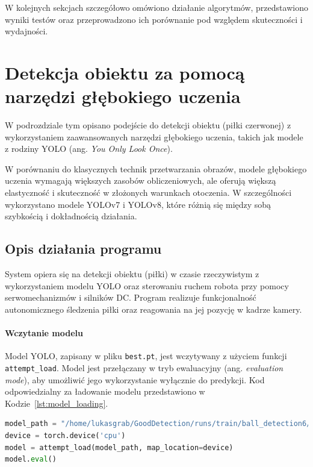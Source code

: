 \documentclass[a4paper,twoside,12pt]{book}
\begin{document}
W kolejnych sekcjach szczegółowo omówiono działanie algorytmów, przedstawiono wyniki testów oraz przeprowadzono ich porównanie pod względem skuteczności i wydajności. 


\section{Detekcja obiektu za pomocą narzędzi głębokiego uczenia}

W podrozdziale tym opisano podejście do detekcji obiektu (piłki czerwonej) z wykorzystaniem zaawansowanych narzędzi głębokiego uczenia, takich jak modele z rodziny YOLO (ang. \textit{You Only Look Once}).

W porównaniu do klasycznych technik przetwarzania obrazów, modele głębokiego uczenia wymagają większych zasobów obliczeniowych, ale oferują większą elastyczność i skuteczność w złożonych warunkach otoczenia. W szczególności wykorzystano modele YOLOv7 i YOLOv8, które różnią się między sobą szybkością i dokładnością działania.

\newpage
\subsection{Opis działania programu}

System opiera się na detekcji obiektu (piłki) w czasie rzeczywistym z wykorzystaniem modelu YOLO oraz sterowaniu ruchem robota przy pomocy serwomechanizmów i silników DC. Program realizuje funkcjonalność autonomicznego śledzenia piłki oraz reagowania na jej pozycję w kadrze kamery.

\paragraph{Wczytanie modelu}
Model YOLO, zapisany w pliku \texttt{best.pt}, jest wczytywany z użyciem funkcji \texttt{attempt\_load}. Model jest przełączany w tryb ewaluacyjny (ang. \textit{evaluation mode}), aby umożliwić jego wykorzystanie wyłącznie do predykcji. Kod odpowiedzialny za ładowanie modelu przedstawiono w Kodzie~\ref{lst:model_loading}.

\begin{lstlisting}[language=Python, caption={Ładowanie modelu YOLO do pamięci.}, label={lst:model_loading}, captionpos=b]
model_path = "/home/lukasgrab/GoodDetection/runs/train/ball_detection6/weights/best.pt"
device = torch.device('cpu')
model = attempt_load(model_path, map_location=device)
model.eval()
\end{lstlisting}
\end{document}
